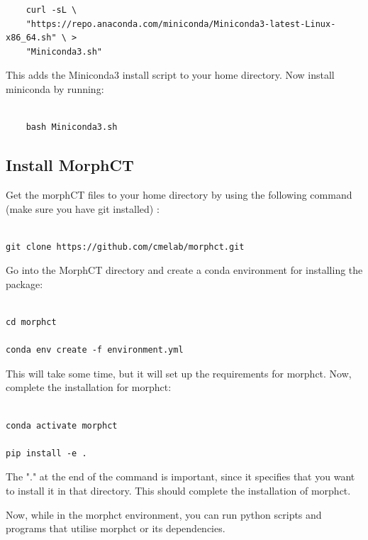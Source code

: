 \documentclass{article}
\begin{document}
\begin{lstlisting}
    curl -sL \
    "https://repo.anaconda.com/miniconda/Miniconda3-latest-Linux-x86_64.sh" \ >
    "Miniconda3.sh"
\end{lstlisting}

This adds the Miniconda3 install script to your home directory. Now install miniconda by running:

\begin{lstlisting}

    bash Miniconda3.sh

\end{lstlisting}

\subsection{Install MorphCT}

Get the morphCT files to your home directory by using the following command (make sure you have git installed) :

\begin{lstlisting}

git clone https://github.com/cmelab/morphct.git

\end{lstlisting}

Go into the MorphCT directory and create a conda environment for installing the package:

\begin{lstlisting}

cd morphct

conda env create -f environment.yml

\end{lstlisting}

This will take some time, but it will set up the requirements for morphct. Now, complete the installation for morphct:

\begin{lstlisting}

conda activate morphct

pip install -e .

\end{lstlisting}

The "." at the end of the command is important, since it specifies that you want to install it in that directory. This should complete the installation of morphct.

Now, while in the morphct environment, you can run python scripts and programs that utilise morphct or its dependencies.
\end{document}
